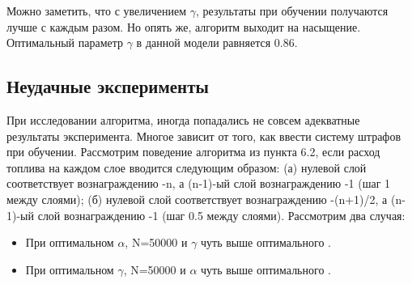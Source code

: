 \documentclass[a4paper]{report}
\theoremstyle{definition}
\theoremstyle{plain}
\theoremstyle{remark}
\theoremstyle{remark}
\theoremstyle{definition}
\begin{document}
Можно заметить, что с увеличением $\gamma$, результаты при обучении получаются лучше с каждым разом. Но опять же, алгоритм выходит на насыщение. Оптимальный параметр $\gamma$ в данной модели равняется 0.86.

\begin{center}
    \subsection{Неудачные эксперименты}
\end{center}

При исследовании алгоритма, иногда попадались не совсем адекватные результаты эксперимента. Многое зависит от того, как ввести систему штрафов при обучении. Рассмотрим поведение алгоритма из пункта 6.2, если расход топлива на каждом слое вводится следующим образом: (а) нулевой слой соответствует вознаграждению -n, а (n-1)-ый слой вознаграждению -1 (шаг 1 между слоями); (б) нулевой слой соответствует вознаграждению -(n+1)/2, а (n-1)-ый слой вознаграждению -1 (шаг 0.5 между слоями). Рассмотрим два случая:
\begin{itemize}
    \item При оптимальном $\alpha$, N=50000 и $\gamma$ чуть выше оптимального .
    \item При оптимальном $\gamma$, N=50000 и $\alpha$ чуть выше оптимального .
\end{itemize}
\end{document}
